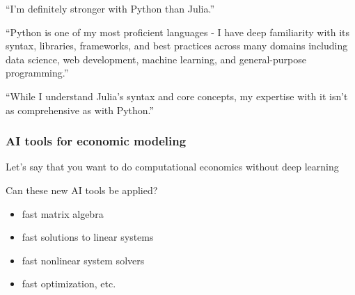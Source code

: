 \begin{frame}
    
    ``I'm definitely stronger with Python than Julia.''

    \vspace{0.5em}
    \vspace{0.5em}
    ``Python is one of my most proficient languages - I have deep familiarity with
    its syntax, libraries, frameworks, and best practices across many domains
    including data science, web development, machine learning, and
    general-purpose programming.''

    \vspace{0.5em}
    \vspace{0.5em}
    ``While I understand Julia's syntax and core concepts, my expertise with it
    isn't as comprehensive as with Python.''

\end{frame}

\begin{frame}
    \frametitle{AI tools for economic modeling}

    Let's say that you want to do computational economics without deep learning

    \vspace{0.5em}
    Can these new AI tools be applied?

    \pause

    \vspace{0.5em}
    \vspace{0.5em}

    \begin{itemize}
        \item fast matrix algebra
        \vspace{0.5em}
        \item fast solutions to linear systems
        \vspace{0.5em}
        \item fast nonlinear system solvers
        \vspace{0.5em}
        \item fast optimization, etc.
    \end{itemize}


\end{frame}



